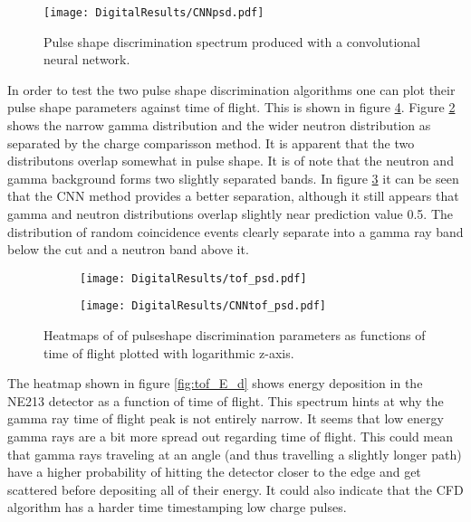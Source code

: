 \documentclass[main.tex]{subfiles}
\begin{document}
\begin{figure}[ht]
    \centering
        \texttt{[image: DigitalResults/CNNpsd.pdf]}
        \caption{Pulse shape discrimination spectrum produced with a convolutional neural network.}
    \label{fig:cnn_E} 
\end{figure}

In order to test the two pulse shape discrimination algorithms one can plot their pulse shape parameters against time of flight. This is shown in figure \ref{fig:tof_cc_tof_cnn}. Figure \ref{fig:tof_digi_cc} shows the narrow gamma distribution and the wider neutron distribution as separated by the charge comparisson method. It is apparent that the two distributons overlap somewhat in pulse shape. It is of note that the neutron and gamma background forms two slightly separated bands.  In figure \ref{fig:tof_digi_cnn} it can be seen that the CNN method provides a better separation, although it still appears that gamma and neutron distributions overlap slightly near prediction value 0.5. The distribution of random coincidence events clearly separate into a gamma ray band below the cut and a neutron band above it.


\begin{figure}
    \centering
    \begin{subfigure}[ht]{\textwidth}
        \texttt{[image: DigitalResults/tof\_psd.pdf]}
        \caption{}
        \label{fig:tof_digi_cc}
    \end{subfigure}
	\begin{subfigure}[ht]{\textwidth}
        \texttt{[image: DigitalResults/CNNtof\_psd.pdf]}
        \caption{}
        \label{fig:tof_digi_cnn}
    \end{subfigure}
    \caption{Heatmaps of of pulseshape discrimination parameters as functions of time of flight plotted with logarithmic z-axis.}
    \label{fig:tof_cc_tof_cnn}
\end{figure}

The heatmap shown in figure \ref{fig:tof_E_d} shows energy deposition in the NE213 detector as a function of time of flight. This spectrum hints at why the gamma ray time of flight peak is not entirely narrow. It seems that low energy gamma rays are a bit more spread out regarding time of flight. This could mean that gamma rays traveling at an angle (and thus travelling a slightly longer path) have a higher probability of hitting the detector closer to the edge and get scattered before depositing all of their energy. It could also indicate that the CFD algorithm has a harder time timestamping low charge pulses.
\end{document}
